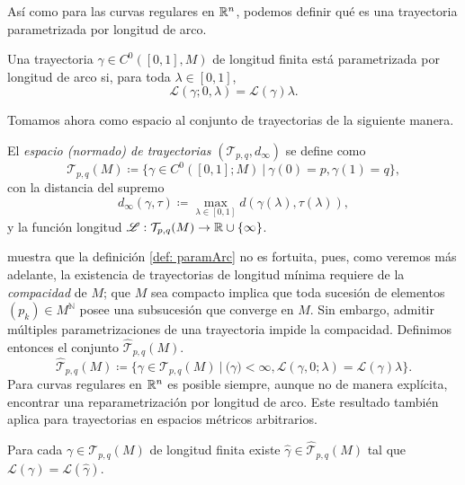 Así como para las curvas regulares en $\mathbb R^n$, podemos definir qué es una trayectoria parametrizada por longitud de arco.
\begin{definition}\label{def: paramArc}
	Una trayectoria $\gamma \in C^0([0, 1], M)$ de longitud finita está parametrizada por longitud de arco si, para toda $\lambda \in [0, 1]$,
	\begin{equation}
		\mathscr L(\gamma; 0, \lambda) = \mathscr L(\gamma)\lambda.
	\end{equation}
\end{definition}

Tomamos ahora como espacio al conjunto de trayectorias de la siguiente manera.
\begin{definition}\label{def: tray}
	El \emph{espacio (normado) de trayectorias} $(\mathcal T_{p, q}, d_\infty)$ se define como
	\begin{equation}
		\mathcal T_{p, q}(M) \coloneqq \{ \gamma \in C^0([0, 1]; M) \ \vert \  \gamma(0) = p, \gamma(1) = q\},
	\end{equation}
	con la distancia del supremo
	\begin{equation}
		d_\infty(\gamma, \tau) \coloneqq \max_{\lambda \in [0,1]} d(\gamma(\lambda), \tau(\lambda)),
	\end{equation}
	y la función longitud $\mathscr L : \mathcal T_{p, q}(M) \to \mathbb R \cup \{\infty\}$.
\end{definition}

\parencite{clapp-2010} muestra que la definición \ref{def: paramArc} no es fortuita, pues, como veremos más adelante, la existencia de trayectorias de longitud mínima requiere de la \emph{compacidad} de $M$; que $M$ sea compacto implica que toda sucesión de elementos $(p_k) \in M^{\mathbb N}$ posee una subsucesión que converge en $M$. Sin embargo, admitir múltiples parametrizaciones de una trayectoria impide la compacidad.
Definimos entonces el conjunto $\hat{\mathcal T}_{p,q}(M)$.
\begin{equation}
	\hat{\mathcal T}_{p,q}(M) \coloneqq \{ \gamma \in \mathcal T_{p, q}(M) \ \vert \  \mathscr(\gamma) < \infty, \mathscr L(\gamma, 0; \lambda) = \mathscr L(\gamma)\lambda\}.
\end{equation}
Para curvas regulares en $\mathbb R^n$ es posible siempre, aunque no de manera explícita, encontrar una reparametrización por longitud de arco. Este resultado también aplica para trayectorias en espacios métricos arbitrarios.
\begin{lemma}
	Para cada $\gamma \in {\mathcal T}_{p,q}(M)$ de longitud finita existe $\hat \gamma \in \hat{\mathcal T}_{p,q}(M)$ tal que $\mathscr L(\gamma) = \mathscr L(\hat \gamma)$.
\end{lemma}

